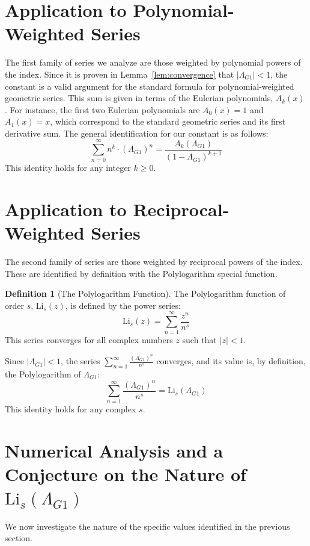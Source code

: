 \documentclass{amsart}
\theoremstyle{plain}
\theoremstyle{definition}
\newtheorem{definition}[theorem]{Definition}
\theoremstyle{remark}
\newcommand{\LambdaG}{\Lambda_{G1}}
\begin{document}
\section{Application to Polynomial-Weighted Series}
The first family of series we analyze are those weighted by polynomial powers of the index. Since it is proven in Lemma~\ref{lem:convergence} that $|\LambdaG|<1$, the constant is a valid argument for the standard formula for polynomial-weighted geometric series. This sum is given in terms of the Eulerian polynomials, $A_k(x)$ \cite{AandS}. For instance, the first two Eulerian polynomials are $A_0(x)=1$ and $A_1(x)=x$, which correspond to the standard geometric series and its first derivative sum. The general identification for our constant is as follows:
$$ \sum_{n=0}^{\infty} n^k \cdot (\LambdaG)^n = \frac{A_k(\LambdaG)}{(1-\LambdaG)^{k+1}} $$
This identity holds for any integer $k \ge 0$.

\section{Application to Reciprocal-Weighted Series}
The second family of series are those weighted by reciprocal powers of the index. These are identified by definition with the Polylogarithm special function.

\begin{definition}[The Polylogarithm Function]
The Polylogarithm function of order $s$, $\mathrm{Li}_s(z)$, is defined by the power series:
$$ \mathrm{Li}_s(z) = \sum_{n=1}^{\infty} \frac{z^n}{n^s} $$
This series converges for all complex numbers $z$ such that $|z|<1$.
\end{definition}

Since $|\LambdaG| < 1$, the series $\sum_{n=1}^{\infty} \frac{(\LambdaG)^{n}}{n^s}$ converges, and its value is, by definition, the Polylogarithm of $\LambdaG$:
$$ \sum_{n=1}^{\infty} \frac{(\LambdaG)^{n}}{n^s} = \mathrm{Li}_s(\LambdaG) $$
This identity holds for any complex $s$.

\section{Numerical Analysis and a Conjecture on the Nature of \texorpdfstring{$\mathrm{Li}_s(\LambdaG)$}{Li\_s(Lambda\_G1)}}
We now investigate the nature of the specific values identified in the previous section.
\end{document}
